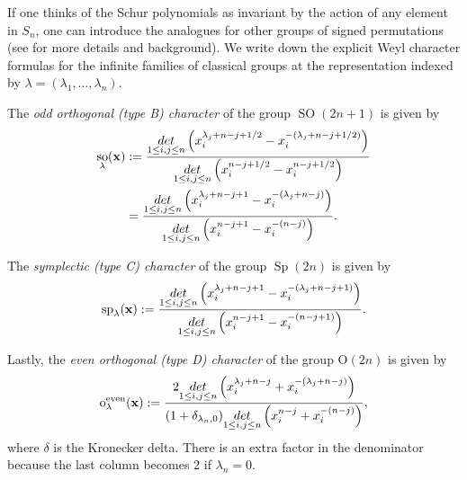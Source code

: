 \documentclass[11pt,letterpaper]{amsart}
\def\det{{\rm det}}
\DeclareMathOperator{\Sp}{Sp}
\DeclareMathOperator{\OO}{SO}
\renewcommand{\OE}{\mathrm{O}}
\renewcommand{\sp}{\mathrm{sp}}
\DeclareMathOperator{\oo}{so}
\renewcommand{\oe}{\mathrm{o}^{\text{even}}}
\numberwithin{equation}{section}
\numberwithin{df}{section}
\begin{document}
If one thinks of the Schur polynomials as invariant by the action of any element in $S_n$, one can introduce the analogues for other groups of signed permutations (see \cite{AyyerKumari,FH,Kradet1,Kradet2} for more details and background).
We write down the explicit Weyl character formulas for the infinite families of classical groups at the representation indexed by $\lambda = (\lambda_1,\dots,\lambda_n)$.

The \emph{odd orthogonal (type B) character} of the group $\OO(2n+1)$ is given by
\begin{align}
\label{oodef}
\oo_\lambda(\mathbf{x})&:=
\frac{\underset{1\le i,j\le n}{\det}\left(x_i^{\lambda_j+n-j+1/2}-x_i^{-(\lambda_j+n-j+1/2)}\right)}
{\underset{1\le i,j\le n}{\det}\left(x_i^{n-j+1/2}-x_i^{n-j+1/2}\right)} \notag\\
&= \frac{\underset{1\le i,j\le n}{\det}\left(x_i^{\lambda_j+n-j+1}-x_i^{-(\lambda_j+n-j)}\right)}
{\underset{1\le i,j\le n}{\det}\left(x_i^{n-j+1}-x_i^{-(n-j)}\right)}.
\end{align}

The \emph{symplectic (type C) character} of the group $\Sp(2n)$ is given by
\begin{equation}
\label{spdef}
\sp_\lambda(\mathbf{x}):=
\frac{\underset{1\le i,j\le n}{\det}\left(x_i^{\lambda_j+n-j+1}-x_i^{-(\lambda_j+n-j+1)}\right)}
{\underset{1\le i,j\le n}{\det}\left(x_i^{n-j+1}-x_i^{-(n-j+1)}\right)}.
\end{equation}

Lastly, the \emph{even orthogonal (type D) character} of the group $\OE(2n)$ is given by
\begin{equation}
\label{oedef}
\oe_\lambda(\mathbf{x}):=
\frac{2\underset{1\le i,j\le n}{\det}\left(x_i^{\lambda_j+n-j}+x_i^{-(\lambda_j+n-j)}\right)}
{\displaystyle (1+\delta_{\lambda_n,0})
\underset{1\le i,j\le n}{\det}\left(x_i^{n-j}+x_i^{-(n-j)}\right)},
\end{equation}
where $\delta$ is the Kronecker delta. 
There is an extra factor in the denominator because the last column becomes $2$ if $\lambda_n = 0$. 



\end{document}
